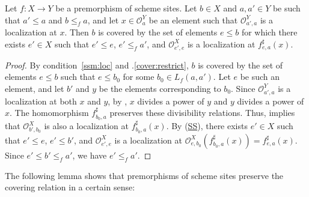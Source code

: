 \documentclass[reqno]{amsart}
\newcommand{\axref}[1]{(\hyperref[ax:#1]{#1})}
\theoremstyle{definition}
\theoremstyle{remark}
\numberwithin{figure}{section}
\begin{document}
\begin{lem}
Let $f : X \to Y$ be a premorphism of scheme sites.
Let $b \in X$ and $a,a' \in Y$ be such that $a' \leq a$ and $b \leq_f a$, and let $x \in \mathcal{O}^Y_a$ be an element such that $\mathcal{O}^Y_{a',a}$ is a localization at $x$.
Then $b$ is covered by the set of elements $e \leq b$ for which there exists $e' \in X$ such that $e' \leq e$, $e' \leq_f a'$, and $\mathcal{O}^X_{e',e}$ is a localization at $f^\sharp_{e,a}(x)$.
\end{lem}
\begin{proof}
By condition~\eqref{ssm:loc} and .\eqref{cover:restrict}, $b$ is covered by the set of elements $e \leq b$ such that $e \leq b_0$ for some $b_0 \in L_f(a,a')$.
Let $e$ be such an element, and let $b'$ and $y$ be the elements corresponding to $b_0$.
Since $\mathcal{O}^Y_{a',a}$ is a localization at both $x$ and $y$, by , $x$ divides a power of $y$ and $y$ divides a power of $x$.
The homomorphism $f^\sharp_{b_0,a}$ preserves these divisibility relations.
Thus,  implies that $\mathcal{O}^X_{b',b_0}$ is also a localization at $f^\sharp_{b_0,a}(x)$.
By \axref{SS}, there exists $e' \in X$ such that $e' \leq e$, $e' \leq b'$, and $\mathcal{O}^X_{e',e}$ is a localization at $\mathcal{O}^X_{e,b_0}(f^\sharp_{b_0,a}(x)) = f^\sharp_{e,a}(x)$.
Since $e' \leq b' \leq_f a'$, we have $e' \leq_f a'$.
\end{proof}

The following lemma shows that premorphisms of scheme sites preserve the covering relation in a certain sense:
\end{document}
